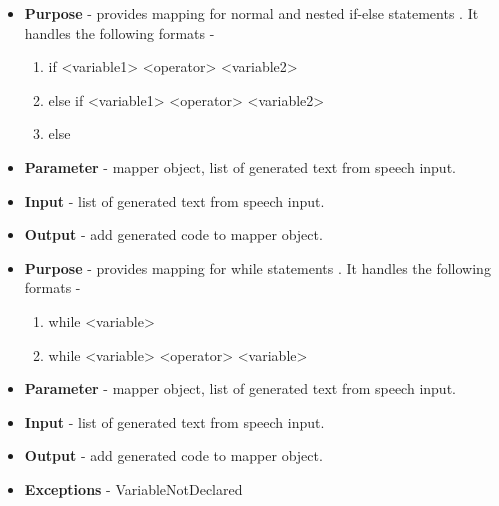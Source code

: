 \documentclass[12pt]{article}
\newcounter{subsubsubsection}[subsubsection]
\begin{document}
\begin{itemize}
    \setlength{\itemsep}{1pt}
    \item \textbf{Purpose} - provides mapping for normal and nested if-else statements . It handles the following formats -
\begin{enumerate}
    \item if <variable1> <operator> <variable2>
    \item else if <variable1> <operator> <variable2>
    \item else
\end{enumerate}
    \item \textbf{Parameter} - mapper object, list of generated text from speech input.
    \item \textbf{Input} - list of generated text from speech input.
    \item \textbf{Output} - add generated code to mapper object.
\end{itemize}

\begin{itemize}
    \setlength{\itemsep}{1pt}
    \item \textbf{Purpose} - provides mapping for while statements . It handles the following formats - 	
    \begin{enumerate}
        \item while <variable>
        \item while <variable> <operator> <variable>
    \end{enumerate}
    \item \textbf{Parameter} - mapper object, list of generated text from speech input.
    \item \textbf{Input} - list of generated text from speech input.
    \item \textbf{Output} - add generated code to mapper object.
    \item \textbf{Exceptions} - VariableNotDeclared
\end{itemize}
\end{document}
